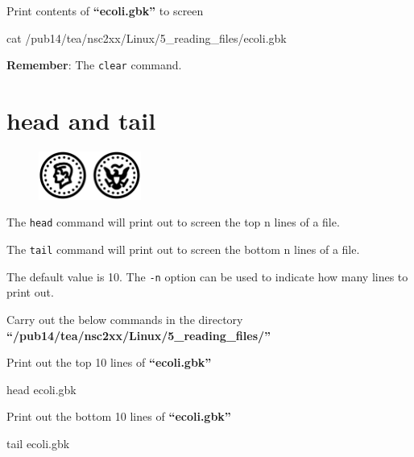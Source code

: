\documentclass[
  letterpaper,
  DIV=11,
  numbers=noendperiod]{scrreprt}
\newenvironment{Shaded}{\begin{snugshade}}{\end{snugshade}}
\newcommand{\FunctionTok}[1]{\textcolor[rgb]{0.28,0.35,0.67}{#1}}
\newcommand{\NormalTok}[1]{\textcolor[rgb]{0.00,0.23,0.31}{#1}}
\begin{document}
Print contents of \textbf{``ecoli.gbk''} to screen

\begin{Shaded}
\begin{Highlighting}[]
\FunctionTok{cat}\NormalTok{ /pub14/tea/nsc2xx/Linux/5\_reading\_files/ecoli.gbk}
\end{Highlighting}
\end{Shaded}

\textbf{Remember}: The \texttt{clear} command.

\hypertarget{head-and-tail}{%
\section{head and tail}\label{head-and-tail}}

\begin{figure}

{\centering \includegraphics[width=0.3\textwidth,height=\textheight]{figures/head_and_tails.png}

}

\end{figure}

The \texttt{head} command will print out to screen the top n lines of a
file.

The \texttt{tail} command will print out to screen the bottom n lines of
a file.

The default value is 10. The \texttt{-n} option can be used to indicate
how many lines to print out.

Carry out the below commands in the directory
\textbf{``/pub14/tea/nsc2xx/Linux/5\_reading\_files/''}

Print out the top 10 lines of \textbf{``ecoli.gbk''}

\begin{Shaded}
\begin{Highlighting}[]
\FunctionTok{head}\NormalTok{ ecoli.gbk}
\end{Highlighting}
\end{Shaded}

Print out the bottom 10 lines of \textbf{``ecoli.gbk''}

\begin{Shaded}
\begin{Highlighting}[]
\FunctionTok{tail}\NormalTok{ ecoli.gbk}
\end{Highlighting}
\end{Shaded}
\end{document}
